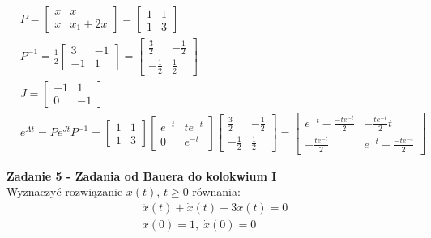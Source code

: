 \documentclass[a4paper,11pt]{article}
\begin{document}
\begin{align*}
&P = 
\begin{bmatrix}
x & x \\
x & x_1+2x
\end{bmatrix}
=
\begin{bmatrix}
1 & 1 \\
1 & 3
\end{bmatrix} \\
&P^{-1}=\frac{1}{2}
\begin{bmatrix}
3 & -1 \\
-1 & 1 
\end{bmatrix} 
=
\begin{bmatrix}
\frac{3}{2} & -\frac{1}{2} \\
-\frac{1}{2} & \frac{1}{2}
\end{bmatrix} \\
&J=
\begin{bmatrix}
-1 & 1 \\
0 & -1
\end{bmatrix} \\
&e^{At} = Pe^{Jt}P^{-1} = 
\begin{bmatrix}
1 & 1 \\
1 & 3
\end{bmatrix}
\begin{bmatrix}
e^{-t} & te^{-t} \\
0 & e^{-t}
\end{bmatrix}
\begin{bmatrix}
\frac{3}{2} & -\frac{1}{2} \\
-\frac{1}{2} & \frac{1}{2}
\end{bmatrix}
=
\begin{bmatrix}
e^{-t}-\frac{-te^{-t}}{2} & -\frac{te^{-t}}{2} t \\
-\frac{te^{-t}}{2} & e^{-t}+\frac{-te^{-t}}{2}
\end{bmatrix}
\end{align*}




\newpage
\begin{framed}
\textbf{Zadanie 5 - Zadania od Bauera do kolokwium I } \\ 
Wyznaczyć rozwiązanie \( x(t) \), \( t \geq 0 \) równania:
\begin{align*}
&\ddot{x}(t)+\dot{x}(t)+3x(t)=0 \\
&x(0)=1, \; \dot{x}(0)=0
\end{align*}
\end{framed}
\end{document}
